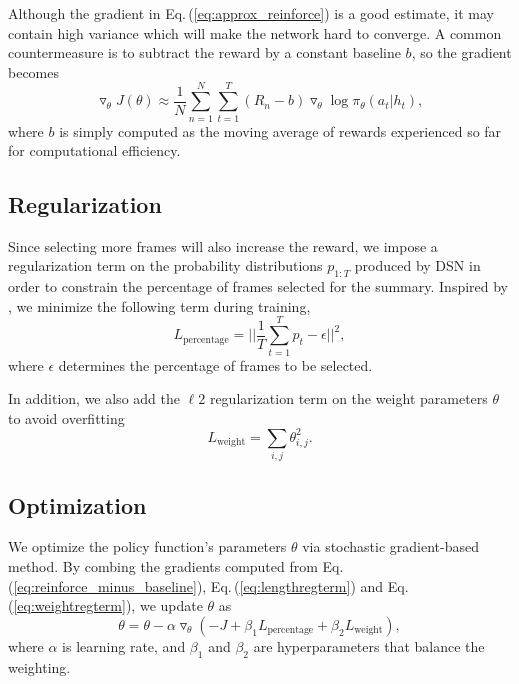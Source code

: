 \documentclass[letterpaper]{article} \usepackage{aaai18}  \usepackage{times}  \usepackage{helvet}  \usepackage{courier}  \usepackage{url}  \usepackage{graphicx}
\begin{document}
Although the gradient in Eq.\,(\ref{eq:approx_reinforce}) is a good estimate, it may contain high variance which will make the network hard to converge. A common countermeasure is to subtract the reward by a constant baseline $b$, so the gradient becomes
\begin{equation} \label{eq:reinforce_minus_baseline}
\triangledown_\theta J (\theta) \approx \frac{1}{N} \sum_{n=1}^N \sum_{t=1}^T (R_n - b) \triangledown_\theta \log \pi_\theta (a_t | h_t),
\end{equation}
where $b$ is simply computed as the moving average of rewards experienced so far for computational efficiency.

\subsection{Regularization}
Since selecting more frames will also increase the reward, we impose a regularization term on the probability distributions $p_{1:T}$ produced by DSN in order to constrain the percentage of frames selected for the summary. Inspired by \cite{mahasseniunsupervised}, we minimize the following term during training,
\begin{equation} \label{eq:lengthregterm}
L_\text{percentage} = || \frac{1}{T} \sum_{t=1}^T p_t - \epsilon ||^2,
\end{equation}
where $\epsilon$ determines the percentage of frames to be selected.

In addition, we also add the $\ell2$ regularization term on the weight parameters $\theta$ to avoid overfitting
\begin{equation} \label{eq:weightregterm}
L_\text{weight} = \sum_{i,j} \theta_{i,j}^2.
\end{equation}

\subsection{Optimization}
We optimize the policy function's parameters $\theta$ via stochastic gradient-based method. By combing the gradients computed from Eq.\,(\ref{eq:reinforce_minus_baseline}), Eq.\,(\ref{eq:lengthregterm}) and Eq.\,(\ref{eq:weightregterm}), we update $\theta$ as
\begin{equation} \label{eq:paramupdate}
\theta = \theta - \alpha \triangledown_\theta (- J + \beta_1 L_\text{percentage} + \beta_2 L_\text{weight}),
\end{equation}
where $\alpha$ is learning rate, and $\beta_1$ and $\beta_2$ are hyperparameters that balance the weighting.
\end{document}
